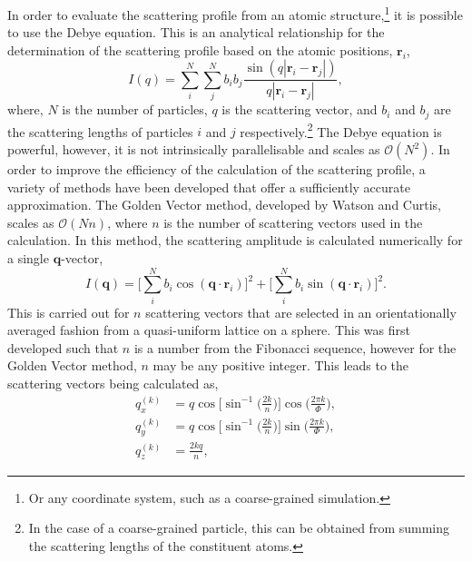 In order to evaluate the scattering profile from an atomic structure,\footnote{Or any coordinate system, such as a coarse-grained simulation.} it is possible to use the Debye equation.
This is an analytical relationship for the determination of the scattering profile based on the atomic positions, $\mathbf{r}_i$,
%
\begin{equation}
    I(q) = \sum_{i}^{N}\sum_{j}^{N} b_ib_j\frac{\sin{(q|\mathbf{r}_i-\mathbf{r}_j|)}}{q|\mathbf{r}_i-\mathbf{r}_j|},
\end{equation}
%
where, $N$ is the number of particles, $q$ is the scattering vector, and $b_i$ and $b_j$ are the scattering lengths of particles $i$ and $j$ respectively.\footnote{In the case of a coarse-grained particle, this can be obtained from summing the scattering lengths of the constituent atoms.}
The Debye equation is powerful, however, it is not intrinsically parallelisable and scales as $\mathcal{O}(N^2)$.
In order to improve the efficiency of the calculation of the scattering profile, a variety of methods have been developed that offer a sufficiently accurate approximation.
The Golden Vector method, developed by Watson and Curtis, scales as $\mathcal{O}(Nn)$, where $n$ is the number of scattering vectors used in the calculation.
In this method, the scattering amplitude is calculated numerically for a single $\mathbf{q}$-vector,
%
\begin{equation}
    I(\mathbf{q}) = \Bigg[\sum_{i}^{N}b_i\cos{(\mathbf{q}\cdot\mathbf{r}_i)}\Bigg]^2 + \Bigg[\sum_{i}^{N}b_i\sin{(\mathbf{q}\cdot\mathbf{r}_i)}\Bigg]^2.
\end{equation}
%
This is carried out for $n$ scattering vectors that are selected in an orientationally averaged fashion from a quasi-uniform lattice on a sphere.
This was first developed such that $n$ is a number from the Fibonacci sequence, however for the Golden Vector method, $n$ may be any positive integer.
This leads to the scattering vectors being calculated as,
%
\begin{equation}
    \begin{aligned}
        q_x^{(k)} & = q\cos\Bigg[\sin^{-1}\bigg(\frac{2k}{n}\bigg)\Bigg]\cos\bigg(\frac{2\pi k}{\Phi}\bigg), \\
        q_y^{(k)} & = q\cos\Bigg[\sin^{-1}\bigg(\frac{2k}{n}\bigg)\Bigg]\sin\bigg(\frac{2\pi k}{\Phi}\bigg), \\
        q_z^{(k)} & = \frac{2 k q}{n},
    \end{aligned}
\end{equation}
